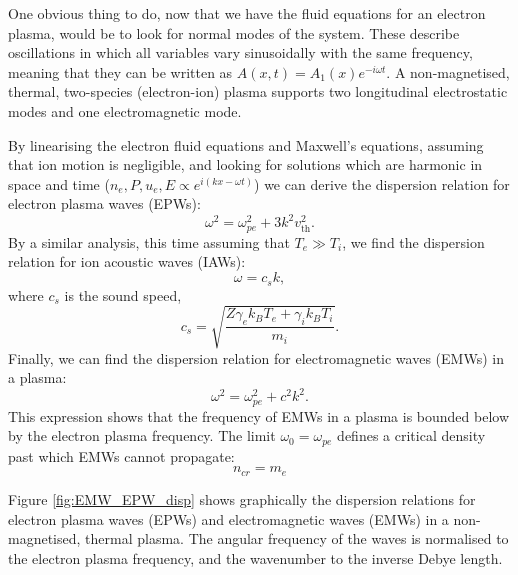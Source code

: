 One obvious thing to do, now that we have the fluid equations for an electron plasma, would be to look for normal modes of the system. These describe oscillations in which all variables vary sinusoidally with the same frequency, meaning that they can be written as $A(x,t) = A_1(x)e^{-i\omega t}$. A non-magnetised, thermal, two-species (electron-ion) plasma supports two longitudinal electrostatic modes and one electromagnetic mode. 


By linearising the electron fluid equations and Maxwell's equations, assuming that ion motion is negligible, and looking for solutions which are harmonic in space and time ($n_e,P,u_e,E \propto  e^{i(kx -\omega t)}$)  we can derive the dispersion relation for electron plasma waves (\acrshort{EPW}s):
\begin{equation}\label{eqn:EPW}
	\omega^{2}=\omega_{p e}^{2}+3 k^{2} v_{\text{th}}^{2}. 
\end{equation} By a similar analysis, this time assuming that $T_e \gg T_i$, we find the dispersion relation for ion acoustic waves (\acrshort{IAW}s):
\begin{equation}\label{eqn:IAW}
 \omega =  c_{s} k,
\end{equation} where $c_{s}$ is the sound speed,
\begin{equation}
c_s = \sqrt{\frac{Z\gamma_ek_BT_e + \gamma_ik_BT_i}{m_i}}.
\end{equation} Finally, we can find the dispersion relation for electromagnetic waves (\acrshort{EMW}s) in a plasma:
\begin{equation}\label{eqn:EMW}
 \omega^{2}=\omega_{p e}^{2}+c^2k^{2}.
\end{equation} This expression shows that the frequency of EMWs in a plasma is bounded below by the electron plasma frequency. The limit $\omega_0=\omega_{pe}$ defines a critical density past which EMWs cannot propagate:
\begin{equation}\label{eqn:ncrit}
 n_{cr} = m_e
\end{equation} 

Figure \ref{fig:EMW_EPW_disp} shows graphically the dispersion relations for electron plasma waves (\acrshort{EPW}s) and electromagnetic waves (\acrshort{EMW}s) in a non-magnetised, thermal plasma. The angular frequency of the waves is normalised to the electron plasma frequency, and the wavenumber to the inverse Debye length. 


